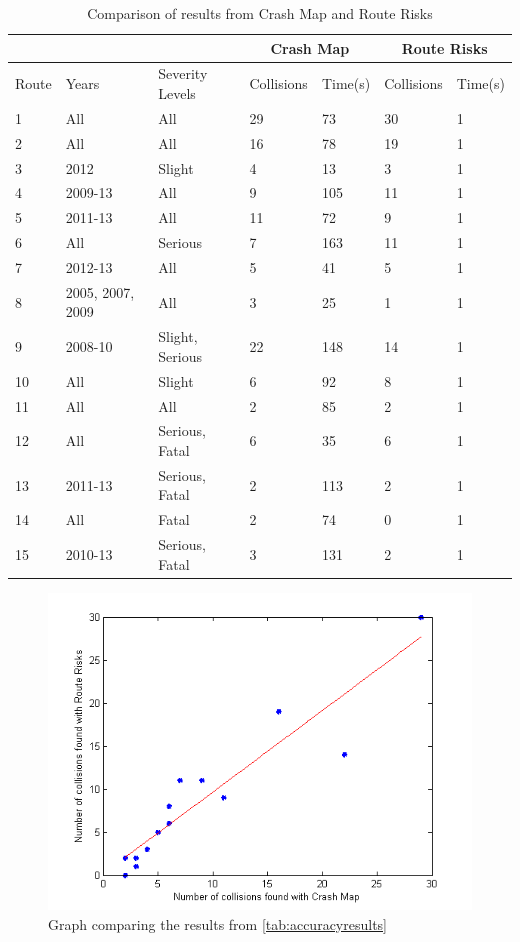\documentclass[authoryearcitations]{UoYCSproject}
\begin{document}
\begin{table}
	\center
	\caption{Comparison of results from Crash Map and Route Risks}
	\label{tab:accuracyresults}
	\begin{tabular}{| p{1cm} | p{2cm} | p{2.5cm} | p{1.7cm} | p{1.7cm} | p{1.7cm} | p{1.7cm} |}
	\hline
	\multicolumn{3}{|c|}{} & \multicolumn{2}{c|}{\textbf{Crash Map}} & \multicolumn{2}{c|}{\textbf{Route Risks}}  \\ \hline
	Route & Years & Severity Levels & Collisions & Time(s) & Collisions & Time(s) \\ \hline
	1 & All & All & 29 & 73 & 30 & 1 \\ \hline
	2 & All & All &16 & 78 & 19 & 1 \\ \hline
	3 & 2012 & Slight & 4 & 13 & 3 & 1 \\ \hline
	4 & 2009-13 & All & 9 & 105 & 11 & 1 \\ \hline
	5 & 2011-13 & All & 11 & 72 & 9 & 1 \\ \hline
	6 & All & Serious & 7 & 163 & 11 & 1 \\ \hline
	7 & 2012-13 & All & 5 & 41 & 5 & 1 \\ \hline
	8 & 2005, 2007, 2009 & All & 3 & 25 & 1 & 1 \\ \hline
	9 & 2008-10 & Slight, Serious & 22 & 148 & 14 & 1 \\ \hline
	10 & All & Slight & 6 & 92 & 8 & 1 \\ \hline
	11 & All & All & 2 & 85 & 2 & 1 \\ \hline
	12 & All & Serious, Fatal & 6 & 35 & 6 & 1 \\ \hline
	13 & 2011-13 & Serious, Fatal & 2 & 113 & 2 & 1 \\ \hline
	14 & All & Fatal & 2 & 74 & 0 & 1 \\ \hline
	15 & 2010-13 & Serious, Fatal & 3 & 131 & 2 & 1 \\ \hline
	\end{tabular}
\end{table}

\begin{figure}
	\center
	\includegraphics[scale=1]{accuracycomparison}
	\caption{Graph comparing the results from \autoref{tab:accuracyresults}}
	\label{fig:graphaccuracy}
\end{figure}
\end{document}
